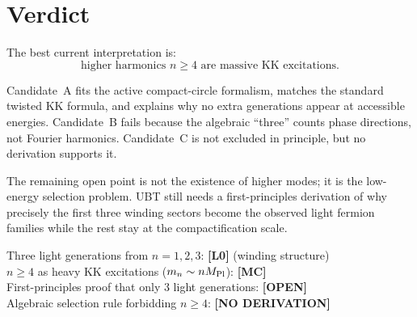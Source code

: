 \documentclass[12pt,a4paper]{article}
\begin{document}
\section{Verdict}

The best current interpretation is:
\[
\boxed{\text{higher harmonics }n\ge 4\text{ are massive KK excitations.}}
\]

Candidate~A fits the active compact-circle formalism, matches the standard
twisted KK formula, and explains why no extra generations appear at accessible
energies.  Candidate~B fails because the algebraic ``three'' counts phase
directions, not Fourier harmonics.  Candidate~C is not excluded in principle,
but no derivation supports it.

The remaining open point is not the existence of higher modes; it is the
low-energy selection problem.  UBT still needs a first-principles derivation of
why precisely the first three winding sectors become the observed light fermion
families while the rest stay at the compactification scale.

\begin{statusbox}
Three light generations from $n=1,2,3$: \textbf{[L0]} (winding structure)\\
$n\geq 4$ as heavy KK excitations ($m_n\sim nM_{\rm Pl}$): \textbf{[MC]}\\
First-principles proof that only 3 light generations: \textbf{[OPEN]}\\
Algebraic selection rule forbidding $n\geq 4$: \textbf{[NO DERIVATION]}\\
\end{statusbox}
\end{document}
